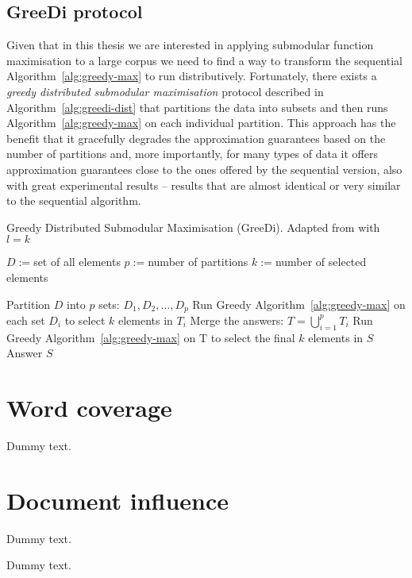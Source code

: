 \subsection{GreeDi protocol}
Given that in this thesis we are interested in applying submodular function
maximisation to a large corpus we need to find a way to transform the
sequential Algorithm~\vref{alg:greedy-max} to run distributively. Fortunately,
there exists a \emph{greedy distributed submodular maximisation} protocol
described in Algorithm~\vref{alg:greedi-dist} that partitions the data into
subsets and then runs Algorithm~\vref{alg:greedy-max} on each individual
partition. This approach has the benefit that it gracefully degrades the
approximation guarantees based on the number of partitions and, more
importantly, for many types of data it offers approximation guarantees close to
the ones offered by the sequential version, also with great experimental
results \cite{NIPS2013_5039} -- results that are almost identical or very
similar to the sequential algorithm.
\begin{algorithm}
  \caption{Greedy Distributed Submodular Maximisation (GreeDi).
      Adapted from \cite{NIPS2013_5039} with \(l = k\)}
  \label{alg:greedi-dist}
  \begin{algorithmic}
    \STATE \(D := \)set of all elements
    \STATE \(p := \)number of partitions
    \STATE \(k := \)number of selected elements
  \end{algorithmic}
  \begin{algorithmic}[1]
    \STATE Partition \(D\) into \(p\) sets: \(D_1, D_2, \ldots, D_p\)
    \STATE Run Greedy Algorithm~\ref{alg:greedy-max} on each set \(D_i\) to
        select \(k\) elements in \(T_i\)
    \STATE Merge the answers: \(T = \bigcup_{i=1}^p T_i\)
    \STATE Run Greedy Algorithm~\ref{alg:greedy-max} on T to select the final
        \(k\) elements in \(S\)
    \STATE Answer \(S\)
  \end{algorithmic}
\end{algorithm}

\section{Word coverage}
\label{sec:word-coverage}

Dummy text.

\section{Document influence}
\label{sec:doc-influence}

Dummy text.

Dummy text.
